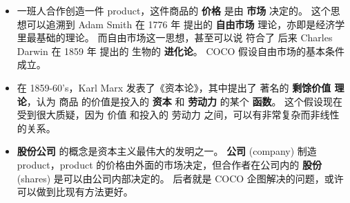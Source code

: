 \documentclass[12pt, orivec]{article}
\newcommand{\cc}[2]{#1}
\newcommand{\cc}[2]{#2}
\begin{document}
\begin{itemize}

\item \cc{
	一班人合作创造一件 product，这件商品的 \textbf{价格} 是由 \textbf{市场} 决定的。  这个思想可以追溯到 Adam Smith 在 1776 年 提出的 \textbf{自由市场} 理论，亦即是经济学里最基础的理论。 而自由市场这一思想，甚至可以说 符合了 后来 Charles Darwin 在 1859 年 提出的 生物的 \textbf{进化论}。  COCO 假设自由市场的基本条件成立。
}{
	When a group of people creates a \textbf{product}, its \textbf{price} is determined by the \textbf{market}.  This idea, first articulated by Adam Smith in 1776, is one of the foundational principles of all economics.  It can be said that free-market competition is also congruent with the idea of biological \textbf{evolution}, posited by Charles Darwin, later in 1859.  We assume here that the conditions of free-market economics are satisfied.
}

\item \cc{
	在 1859-60's，Karl Marx 发表了《资本论》，其中提出了 著名的 \textbf{剩馀价值 理论}，认为 商品 的价值是投入的 \textbf{资本} 和 \textbf{劳动力} 的某个 \textbf{函数}。  这个假设现在受到很大质疑，因为 价值 和投入的 劳动力 之间，可以有非常复杂而非线性的关系。 
}{
	Around 1859-60's, Karl Marx published \textit{Das Kapital}, in which he posited the now-famous theory of \textbf{surplus values}.  According to this view, the value of a commodity is construed as a function of the input of \textbf{capital} and \textbf{labor}.  Currently, this assumption is thrown into great doubt because the value of a product may depend on input labor in highly complex and non-linear relations.
}

\item \cc{
	\textbf{股份公司} 的概念是资本主义最伟大的发明之一。  \textbf{公司} (company) 制造 product，product 的价格由外面的市场决定，但合作者在公司内的 \textbf{股份} (shares) 是可以由公司内部决定的。  后者就是 COCO 企图解决的问题，或许可以做到比现有方法更好。
}{
	Economists would agree that the notion of \textbf{joint-stock companies} is one of the greatest inventions of capitalism.  While prices are determined externally by markets, the shares of a company that a participant owns can be decided internally by the company.  The goal of COCO is to provide a (hopefully) better method of distributing shares for online companies.
}
\end{itemize}


\printbibliography
\end{document}
